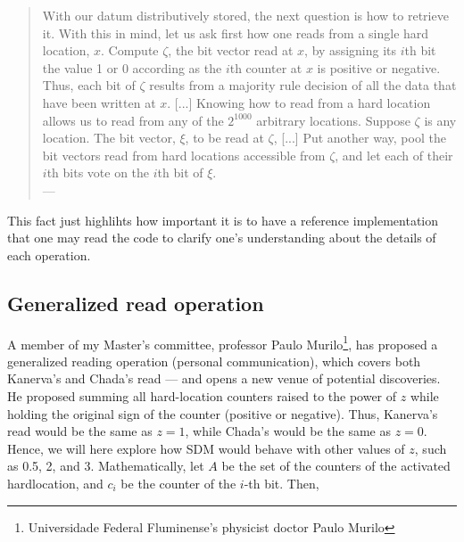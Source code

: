 \begin{samepage}
\begin{quote}
With our datum distributively stored, the next question is how to retrieve it. With this in mind, let us ask first how one reads from a single hard location, $x$. Compute $\zeta$, the bit vector read at $x$, by assigning its $i$th bit the value 1 or 0 according as the $i$th counter at $x$ is positive or negative. Thus, each bit of $\zeta$ results from a majority rule decision of all the data that have been written at $x$. [...] Knowing how to read from a hard location allows us to read from any of the $2^{1000}$ arbitrary locations. Suppose $\zeta$ is any location. The bit vector, $\xi$, to be read at $\zeta$, [...] Put another way, pool the bit vectors read from hard locations accessible from $\zeta$, and let each of their $i$th bits vote on the $i$th bit of $\xi$. \\
\hfill --- \citet[p.342]{anwar2003sparse}
\end{quote}
\end{samepage}

This fact just highlihts how important it is to have a reference implementation that one may read the code to clarify one's understanding about the details of each operation.

\subsection{Generalized read operation}

A member of my Master's committee, professor Paulo Murilo\footnote{Universidade Federal Fluminense's physicist doctor Paulo Murilo}, has proposed a generalized reading operation (personal communication), which covers both Kanerva's and Chada's read --- and opens a new venue of potential discoveries. He proposed summing all hard-location counters raised to the power of $z$ while holding the original sign of the counter (positive or negative). Thus, Kanerva's read would be the same as $z=1$, while Chada's would be the same as $z=0$. Hence, we will here explore how SDM would behave with other values of $z$, such as 0.5, 2, and 3. Mathematically, let $A$ be the set of the counters of the activated hardlocation, and $c_i$ be the counter of the $i$-th bit. Then,

